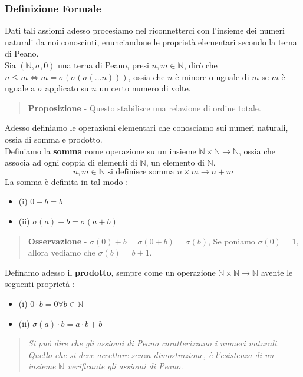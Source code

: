\documentclass[12pt, letterpaper]{article}
\begin{document}
\subsubsection{Definizione Formale}
Dati tali assiomi adesso procesiamo nel riconnetterci con l'insieme dei numeri naturali da noi conosciuti,
enunciandone le proprietà elementari secondo la terna di Peano.\\
Sia \((\mathbb{N} ,\sigma ,0)\) una terna di Peano, presi \(n,m \in \mathbb{N}\), dirò che \(n\le m \iff m = \sigma(\sigma(\sigma(...n)))\),
ossia che \(n\) è minore o uguale di \(m\) se \(m\) è uguale a \(\sigma\) applicato su \(n\) un certo numero di volte. 
\begin{quote}
    \textbf{Proposizione} - Questo stabilisce una relazione di ordine totale.
\end{quote}
Adesso definiamo le operazioni elementari che conosciamo sui numeri naturali, ossia di somma e prodotto.\\
Definiamo la \textbf{somma} come operazione su un insieme \(\mathbb{N} \times \mathbb{N} \rightarrow\mathbb{N}\), ossia che 
associa ad ogni coppia di elementi di \(\mathbb{N}\), un elemento di \(\mathbb{N}\).
\begin{equation}
    n,m\in \mathbb{N}\text{ si definisce somma } n\times m \rightarrow n+m
\end{equation}
La somma è definita in tal modo :
\begin{itemize}
    \item (i) \(0+b=b\)
    \item (ii) \(\sigma(a)+b=\sigma(a+b)\)
\end{itemize}
\begin{quote}
    \textbf{Osservazione} - \(\sigma(0)+b = \sigma(0+b)=\sigma(b)\),
    Se poniamo \(\sigma(0)=1\), allora vediamo che \(\sigma(b)=b+1\).
\end{quote}
Definamo adesso il \textbf{prodotto}, sempre come un operazione \(\mathbb{N} \times \mathbb{N} \rightarrow\mathbb{N}\)
avente le seguenti proprietà :
\begin{itemize}
    \item (i) \(0\cdot b=0 \forall b\in \mathbb{N}\)
    \item (ii) \(\sigma(a)\cdot b = a\cdot b +b\)
\end{itemize}
\begin{quote}
    \textit{Si può dire che gli assiomi di Peano caratterizzano i numeri naturali. Quello che si deve 
    accettare senza dimostrazione, è l'esistenza di un insieme \(\mathbb{N}\) verificante gli
    assiomi di Peano.}
\end{quote}
\end{document}
